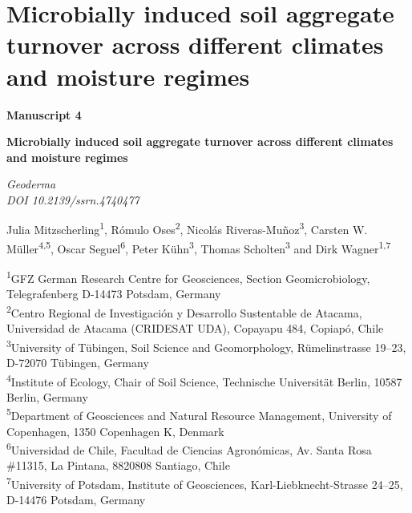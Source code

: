 \chapter{Microbially induced soil aggregate turnover across different climates and moisture regimes}
\label{chap:manuscript4} %

\begin{center}
  \textbf{\Large Manuscript 4}
\end{center}  
\vspace{0.1cm}
\begin{center}
  \textbf{\huge Microbially induced soil aggregate turnover across different climates and moisture regimes}
  
    \vspace{0.2cm}
    \textit{Geoderma}\\
    \textit{DOI 10.2139/ssrn.4740477}
    
    \vspace{0.1cm}
    
  \end{center}
  \begin{justify}
    Julia Mitzscherling\textsuperscript{1}, Rómulo Oses\textsuperscript{2}, Nicolás Riveras-Muñoz\textsuperscript{3}, Carsten W. Müller\textsuperscript{4,5}, Oscar Seguel\textsuperscript{6},   Peter Kühn\textsuperscript{3}, Thomas Scholten\textsuperscript{3} and Dirk Wagner\textsuperscript{1,7}
  \end{justify}

  \vspace{0.2cm}
  
  \begin{scriptsize}
    \begin{justify}
        
      \textsuperscript{1}GFZ German Research Centre for Geosciences, Section Geomicrobiology, Telegrafenberg D-14473 Potsdam, Germany\\
      \textsuperscript{2}Centro Regional de Investigaci{\'o}n y Desarrollo Sustentable de Atacama, Universidad de Atacama (CRIDESAT UDA), Copayapu 484, Copiap{\'o}, Chile\\
      \textsuperscript{3}University of T{\"u}bingen, Soil Science and Geomorphology, R{\"u}melinstrasse 19--23, D-72070 T{\"u}bingen, Germany\\
      \textsuperscript{4}Institute of Ecology, Chair of Soil Science, Technische Universit{\"a}t Berlin, 10587 Berlin, Germany\\
      \textsuperscript{5}Department of Geosciences and Natural Resource Management, University of Copenhagen, 1350 Copenhagen K, Denmark\\
      \textsuperscript{6}Universidad de Chile, Facultad de Ciencias Agron{\'o}micas, Av. Santa Rosa \#11315, La Pintana, 8820808 Santiago, Chile\\
      \textsuperscript{7}University of Potsdam, Institute of Geosciences, Karl-Liebknecht-Strasse 24--25, D-14476 Potsdam, Germany

    \end{justify}
  \end{scriptsize}
    
